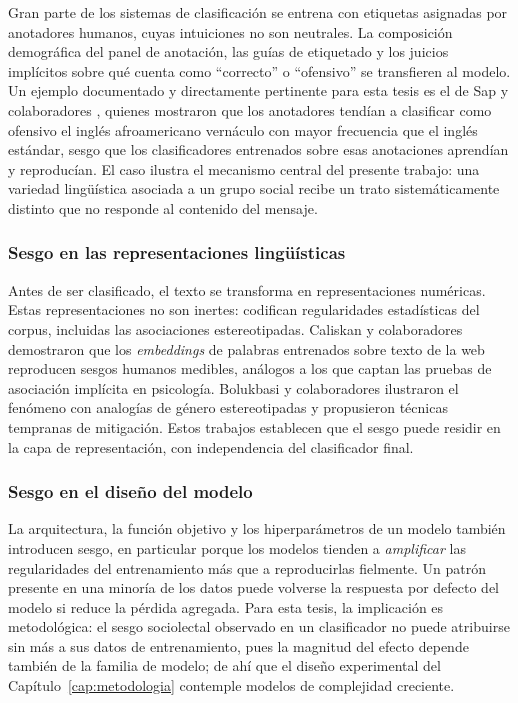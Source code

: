 Gran parte de los sistemas de clasificación se entrena con etiquetas asignadas
por anotadores humanos, cuyas intuiciones no son neutrales. La composición
demográfica del panel de anotación, las guías de etiquetado y los juicios
implícitos sobre qué cuenta como ``correcto'' o ``ofensivo'' se transfieren al
modelo. Un ejemplo documentado y directamente pertinente para esta tesis es el
de Sap y colaboradores \cite{Sap2019Risk}, quienes mostraron que los anotadores
tendían a clasificar como ofensivo el inglés afroamericano vernáculo con mayor
frecuencia que el inglés estándar, sesgo que los clasificadores entrenados sobre
esas anotaciones aprendían y reproducían. El caso ilustra el mecanismo central
del presente trabajo: una variedad lingüística asociada a un grupo social
recibe un trato sistemáticamente distinto que no responde al contenido del
mensaje.

\subsubsection{Sesgo en las representaciones lingüísticas}

Antes de ser clasificado, el texto se transforma en representaciones numéricas.
Estas representaciones no son inertes: codifican regularidades estadísticas del
corpus, incluidas las asociaciones estereotipadas. Caliskan y colaboradores
\cite{Caliskan2017Semantics} demostraron que los \emph{embeddings} de palabras
entrenados sobre texto de la web reproducen sesgos humanos medibles, análogos a
los que captan las pruebas de asociación implícita en psicología. Bolukbasi y
colaboradores \cite{Bolukbasi2016Man} ilustraron el fenómeno con analogías de
género estereotipadas y propusieron técnicas tempranas de mitigación. Estos
trabajos establecen que el sesgo puede residir en la capa de representación,
con independencia del clasificador final.

\subsubsection{Sesgo en el diseño del modelo}

La arquitectura, la función objetivo y los hiperparámetros de un modelo también
introducen sesgo, en particular porque los modelos tienden a \emph{amplificar}
las regularidades del entrenamiento más que a reproducirlas fielmente. Un
patrón presente en una minoría de los datos puede volverse la respuesta por
defecto del modelo si reduce la pérdida agregada. Para esta tesis, la
implicación es metodológica: el sesgo sociolectal observado en un clasificador
no puede atribuirse sin más a sus datos de entrenamiento, pues la magnitud del
efecto depende también de la familia de modelo; de ahí que el diseño
experimental del Capítulo~\ref{cap:metodologia} contemple modelos de
complejidad creciente.


